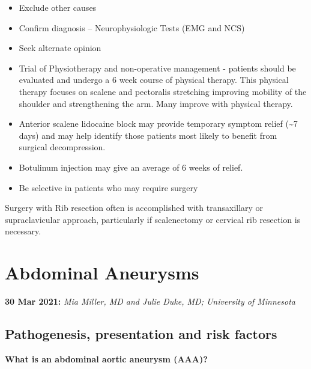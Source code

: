 \documentclass[
]{book}
\begin{document}
\begin{itemize}
\item
  Exclude other causes
\item
  Confirm diagnosis -- Neurophysiologic Tests (EMG and NCS)
\item
  Seek alternate opinion
\item
  Trial of Physiotherapy and non-operative management - patients
  should be evaluated and undergo a 6 week course of physical therapy.
  This physical therapy focuses on scalene and pectoralis stretching
  improving mobility of the shoulder and strengthening the arm. Many
  improve with physical therapy.
  \citep{baldermanPhysicalTherapyManagement2019}
\item
  Anterior scalene lidocaine block may provide temporary symptom
  relief (\textasciitilde7 days) and may help identify those patients most likely
  to benefit from surgical decompression.
  \citep{salhanPC214UltrasoundGuidedAnesthetic2016, lumImpactAnteriorScalene2012}
\item
  Botulinum injection may give an average of 6 weeks of relief.
  \citep{salhanPC214UltrasoundGuidedAnesthetic2016}
\item
  Be selective in patients who may require surgery
\end{itemize}

Surgery with Rib resection often is accomplished with transaxillary or
supraclavicular approach, particularly if scalenectomy or cervical rib
resection is necessary.

\hypertarget{abdominal-aneurysms}{%
\chapter{Abdominal Aneurysms}\label{abdominal-aneurysms}}

\textbf{30 Mar 2021:} \emph{Mia Miller, MD and Julie Duke, MD; University of
Minnesota}

\hypertarget{pathogenesis-presentation-and-risk-factors}{%
\section{Pathogenesis, presentation and risk factors}\label{pathogenesis-presentation-and-risk-factors}}

\textbf{What is an abdominal aortic aneurysm (AAA)?}
\citep{mooreVascularEndovascularSurgery2019}
\end{document}
